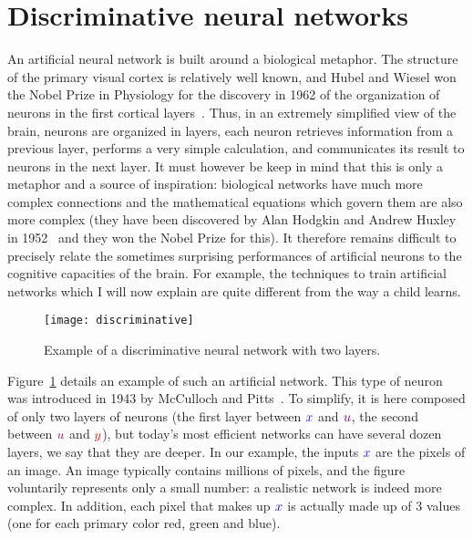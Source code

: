 
\section{Discriminative neural networks}

An artificial neural network is built around a biological metaphor.
%
The structure of the primary visual cortex is relatively well known, and Hubel and Wiesel won the Nobel Prize in Physiology for the discovery in 1962 of the organization of neurons in the first cortical layers~\cite{hubel1962receptive}.
%
Thus, in an extremely simplified view of the brain, neurons are organized in layers, each neuron retrieves information from a previous layer, performs a very simple calculation, and communicates its result to neurons in the next layer.
%
It must however be keep in mind that this is only a metaphor and a source of inspiration: biological networks have much more complex connections and the mathematical equations which govern them are also more complex (they have been discovered by Alan Hodgkin and Andrew Huxley in 1952~\cite{hodgkin1952quantitative} and they won the Nobel Prize for this).
%
It therefore remains difficult to precisely relate the sometimes surprising performances of artificial neurons to the cognitive capacities of the brain. For example, the techniques to train artificial networks which I will now explain are quite different from the way a child learns.

\begin{figure}\centering
	\texttt{[image: discriminative]}
\caption{\label{fig:discriminative} 
Example of a discriminative neural network with two layers.  }
\end{figure}

Figure~\ref{fig:discriminative} details an example of such an artificial network.
%
This type of neuron was introduced in 1943 by McCulloch and Pitts~\cite{mcculloch1943logical}.
%
To simplify, it is here composed of only two layers of neurons (the first layer between ${\color{blue} x}$ and ${\color[rgb]{.5,0, .5} u}$, the second between ${\color[rgb]{.5,0,.5} u}$ and ${\color{red} y}$), but today's most efficient networks can have several dozen layers, we say that they are deeper.
%
In our example, the inputs ${\color{blue} x}$ are the pixels of an image. An image typically contains millions of pixels, and the figure voluntarily represents only a small number: a realistic network is indeed more complex. In addition, each pixel that makes up ${\color{blue} x}$ is actually made up of 3 values (one for each primary color red, green and blue).

